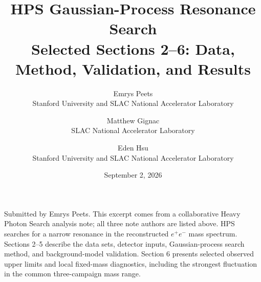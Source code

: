 \documentclass[11pt]{article}
\title{\vspace{1.3in}HPS Gaussian-Process Resonance Search\\[0.5em]
\large Selected Sections 2--6: Data, Method, Validation, and Results}
\author{
Emrys Peets\\Stanford University and SLAC National Accelerator Laboratory
\and
Matthew Gignac\\SLAC National Accelerator Laboratory
\and
Eden Hsu\\Stanford University and SLAC National Accelerator Laboratory
}
\date{September 2, 2026}
\begin{document}
\hypersetup{pageanchor=false}
\begin{titlepage}
\maketitle
\vfill
\begin{center}
\begin{minipage}{0.84\textwidth}
\small
Submitted by Emrys Peets. This excerpt comes from a collaborative Heavy Photon Search
analysis note; all three note authors are listed above. HPS searches for a narrow
resonance in the reconstructed $e^+e^-$ mass spectrum. Sections 2--5 describe the
data sets, detector inputs, Gaussian-process search method, and background-model
validation. Section 6 presents selected observed upper limits and local
fixed-mass diagnostics, including the strongest fluctuation in the common
three-campaign mass range.
\end{minipage}
\end{center}
\vfill
\thispagestyle{empty}
\end{titlepage}

\hypersetup{pageanchor=true}
\setcounter{page}{1}
\setcounter{section}{1}
\setcounter{tocdepth}{2}
\tableofcontents
\clearpage


\FloatBarrier
\clearpage


\FloatBarrier
\clearpage


\FloatBarrier
\clearpage



\FloatBarrier

\clearpage

\FloatBarrier

\clearpage


\end{document}
